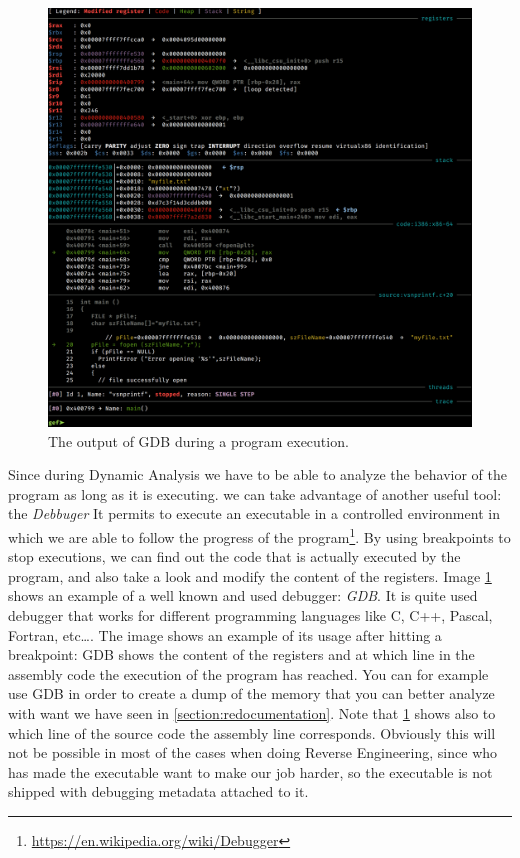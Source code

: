 \documentclass{article}
\begin{document}
\begin{figure}[htp]
    \centering
    \includegraphics[width=1\textwidth]{images/gdb.png}
    \caption{The output of GDB during a program execution.}
    \label{fig:gdb}
\end{figure}
Since during Dynamic Analysis we have to be able to analyze the behavior of the program as long as it is executing. we can take advantage of another useful tool: the  \textit{Debbuger} It permits to execute an executable in a controlled environment in which we are able to follow the progress of the program\footnote{\url{https://en.wikipedia.org/wiki/Debugger}}. By using breakpoints to stop executions, we can find out the code that is actually executed by the program, and also take a look and modify the content of the registers.
Image \ref{fig:gdb} shows an example of a well known and used debugger: \textit{GDB}. It is quite used debugger that works for different programming languages like C, C++, Pascal, Fortran, etc\dots.
The image shows an example of its usage after hitting a breakpoint: GDB shows the content of the registers and at which line in the assembly code the execution of the program has reached. You can for example use GDB in order to create a dump of the memory that you can better analyze with want we have seen in \ref{section:redocumentation}.
Note that \ref{fig:gdb} shows also to which line of the source code the assembly line corresponds. Obviously this will not be possible in most of the cases when doing Reverse Engineering, since who has made the executable want to make our job harder, so the executable is not shipped with debugging metadata attached to it.
\end{document}
